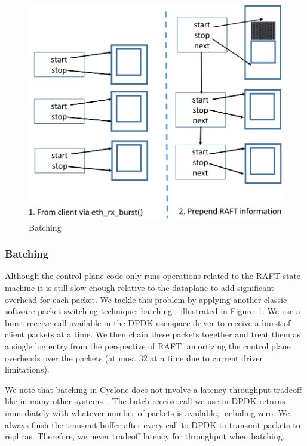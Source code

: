 \documentclass[10pt, preprint, nonatbib]{sigplanconf}
\begin{document}
\begin{figure}
  \centering
  \includegraphics[scale=0.3]{figures2/batching.pdf}
  \caption{Batching}
  \label{fig:batching}
\end{figure}

\subsubsection{Batching}
Although the control plane code only runs operations related to the RAFT state
machine it is still slow enough relative to the dataplane to add significant
overhead for each packet. We tackle this problem by applying another classic
software packet switching technique: batching - illustrated in
Figure~\ref{fig:batching}. We use a burst receive call available in the DPDK
userspace driver to receive a burst of client packets at a time. We then chain
these packets together and treat them as a single log entry from the perspective
of RAFT, amortizing the control plane overheads over the packets (at most 32 at
a time due to current driver limitations).

We note that batching in Cyclone does not involve a latency-throughput
tradeoff like in many other systems~\cite{ix-dataplane}. The batch receive call
we use in DPDK returns immediately with whatever number of packets is available,
including zero. We always flush the transmit buffer after every call to DPDK to
transmit packets to replicas. Therefore, we never tradeoff latency for
throughput when batching. 
\end{document}
